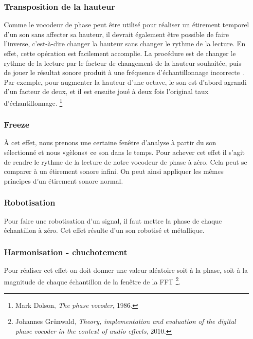     \subsubsection{Transposition de la hauteur}

Comme le vocodeur de phase peut être utilisé pour réaliser un étirement temporel d'un son sans affecter sa hauteur, il devrait également être possible de faire l'inverse, c’est-à-dire changer la hauteur sans changer le rythme de la lecture. En effet, cette opération est facilement accomplie. La procédure est de changer le rythme de la lecture par le facteur de changement de la hauteur souhaitée, puis de jouer le résultat sonore produit à une fréquence d'échantillonnage \guillemotleft incorrecte \guillemotright. Par exemple, pour augmenter la hauteur d’une octave, le son est d'abord agrandi d'un facteur de deux, et il est ensuite joué à deux fois l'original taux d'échantillonnage. \footnote{Mark Dolson, \textit{ The phase vocoder}, 1986. \nocite{Dol86}}

    \subsubsection{Freeze}

À cet effet, nous prenons une certaine fenêtre d’analyse à partir du son sélectionné et nous «gèlons» ce son dans le temps. Pour achever cet effet il s'agit de rendre le rythme de la lecture de notre vocodeur de phase à zéro. Cela peut se comparer à un étirement sonore infini. On peut ainsi appliquer les mêmes principes d'un étirement sonore normal.

    \subsubsection{Robotisation}

Pour faire une robotisation d'un signal, il faut mettre la phase de chaque échantillon à zéro. Cet effet résulte d'un son robotisé et métallique.

    \subsubsection{Harmonisation - chuchotement}

Pour réaliser cet effet on doit donner une valeur aléatoire soit à la phase, soit à la magnitude de chaque échantillon de la fenêtre de la FFT \footnote{Johannes Grünwald, \textit{ Theory, implementation and evaluation of the digital phase vocoder in the context of audio effects}, 2010. \nocite{GR10}}.


